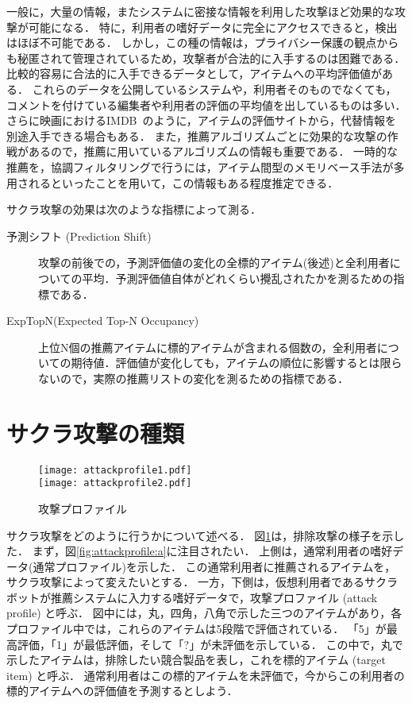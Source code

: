 一般に，大量の情報，またシステムに密接な情報を利用した攻撃ほど効果的な攻撃が可能になる．
特に，利用者の嗜好データに完全にアクセスできると，検出はほぼ不可能である．
しかし，この種の情報は，プライバシー保護の観点からも秘匿されて管理されているため，攻撃者が合法的に入手するのは困難である．
比較的容易に合法的に入手できるデータとして，アイテムへの平均評価値がある．
これらのデータを公開しているシステムや，利用者そのものでなくても，コメントを付けている編集者や利用者の評価の平均値を出しているものは多い．
さらに映画におけるIMDB~\cite{misc:141}のように，アイテムの評価サイトから，代替情報を別途入手できる場合もある．
また，推薦アルゴリズムごとに効果的な攻撃の作戦があるので，推薦に用いているアルゴリズムの情報も重要である．
一時的な推薦を，協調フィルタリングで行うには，アイテム間型のメモリベース手法が多用されるといったことを用いて，この情報もある程度推定できる．

サクラ攻撃の効果は次のような指標によって測る．
\begin{description}
\item[予測シフト (Prediction Shift)] 攻撃の前後での，予測評価値の変化の全標的アイテム(後述)と全利用者についての平均．予測評価値自体がどれくらい攪乱されたかを測るための指標である．
\item[ExpTopN(Expected Top-N Occupancy)] 上位N個の推薦アイテムに標的アイテムが含まれる個数の，全利用者についての期待値．評価値が変化しても，アイテムの順位に影響するとは限らないので，実際の推薦リストの変化を測るための指標である．
\end{description}

\section{サクラ攻撃の種類}
\label{sec:shilling:tactics}

\begin{figure}
\centering
{}%
{\texttt{[image: attackprofile1.pdf]}}\\\bigskip
{}%
{\texttt{[image: attackprofile2.pdf]}}
\caption{攻撃プロファイル}
\label{fig:attackprofile}
\end{figure}

サクラ攻撃をどのように行うかについて述べる\cite{www:04:01}．
図\ref{fig:attackprofile}は，排除攻撃の様子を示した．
まず，図\ref{fig:attackprofile:a}に注目されたい．
上側は，通常利用者の嗜好データ(通常プロファイル)を示した．
この通常利用者に推薦されるアイテムを，サクラ攻撃によって変えたいとする．
一方，下側は，仮想利用者であるサクラボットが推薦システムに入力する嗜好データで，攻撃プロファイル (attack profile) と呼ぶ．
図中には，丸，四角，八角で示した三つのアイテムがあり，各プロファイル中では，これらのアイテムは5段階で評価されている．
「5」が最高評価，「1」が最低評価，そして「?」が未評価を示している．
この中で，丸で示したアイテムは，排除したい競合製品を表し，これを標的アイテム (target item) と呼ぶ．
通常利用者はこの標的アイテムを未評価で，今からこの利用者の標的アイテムへの評価値を予測するとしよう．

